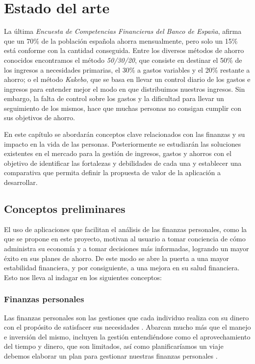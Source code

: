 \chapter{Estado del arte}\label{chap:estado_del_arte}
La última \textit{Encuesta de Competencias Financieras del Banco de España}, afirma que un 70\% de la población española ahorra mensualmente, pero solo un 15\% está conforme con la cantidad conseguida\cite{encuesta-competencias}. Entre los diversos métodos de ahorro conocidos encontramos el método \textit{50/30/20}, que consiste en destinar el 50\% de los ingresos a necesidades primarias, el 30\% a gastos variables y el 20\% restante a ahorro; o el método \textit{Kakebo}, que se basa en llevar un control diario de los gastos e ingresos para entender mejor el modo en que distribuimos nuestros ingresos\cite{metodos-ahorro}. Sin embargo, la falta de control sobre los gastos y la dificultad para llevar un seguimiento de los mismos, hace que muchas personas no consigan cumplir con sus objetivos de ahorro.

En este capítulo se abordarán conceptos clave relacionados con las finanzas y su impacto en la vida de las personas. Posteriormente se estudiarán las soluciones existentes en el mercado para la gestión de ingresos, gastos y ahorros con el objetivo de identificar las fortalezas y debilidades de cada una y establecer una comparativa que permita definir la propuesta de valor de la aplicación a desarrollar.

\section{Conceptos preliminares}
El uso de aplicaciones que facilitan el análisis de las finanzas personales, como la que se propone en este proyecto, motivan al usuario a tomar conciencia de cómo administra su economía y a tomar decisiones más informadas, logrando un mayor éxito en sus planes de ahorro. De este modo se abre la puerta a una mayor estabilidad financiera, y por consiguiente, a una mejora en su salud financiera. Esto nos lleva al indagar en los siguientes conceptos:

\subsection*{Finanzas personales}
Las finanzas personales son las gestiones que cada individuo realiza con su dinero 
con el propósito de satisfacer sus necesidades \cite{tesis-bienestar-financiero}.
Abarcan mucho más que el manejo e inversión del mismo, incluyen la gestión  
entendiéndose como el aprovechamiento del tiempo y dinero, que son limitados, así 
como planificaríamos un viaje debemos elaborar un plan para gestionar nuestras 
finanzas personales \cite{tyson2023personal}. 

